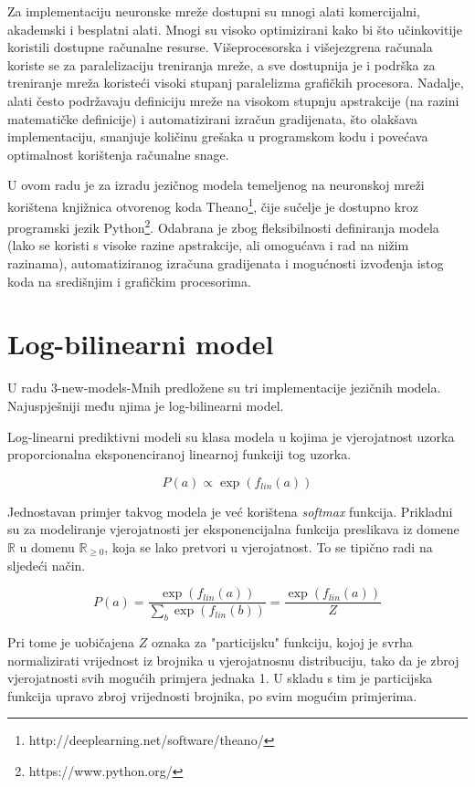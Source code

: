 \documentclass[times, utf8, diplomski, numeric]{fer}
\begin{document}
Za implementaciju neuronske mreže dostupni su mnogi alati komercijalni, akademski i besplatni alati. Mnogi su visoko optimizirani kako bi što učinkovitije koristili dostupne računalne resurse. Višeprocesorska i višejezgrena računala koriste se za paralelizaciju treniranja mreže, a sve dostupnija je i podrška za treniranje mreža koristeći visoki stupanj paralelizma grafičkih procesora. Nadalje, alati često podržavaju definiciju mreže na visokom stupnju apstrakcije (na razini matematičke definicije) i automatizirani izračun gradijenata, što olakšava implementaciju, smanjuje količinu grešaka u programskom kodu i povećava optimalnost korištenja računalne snage.

U ovom radu je za izradu jezičnog modela temeljenog na neuronskoj mreži korištena knjižnica otvorenog koda Theano\footnote{http://deeplearning.net/software/theano/}, čije sučelje je dostupno kroz programski jezik Python\footnote{https://www.python.org/}. Odabrana je zbog fleksibilnosti definiranja modela (lako se koristi s visoke razine apstrakcije, ali omogućava i rad na nižim razinama), automatiziranog izračuna gradijenata i mogućnosti izvođenja istog koda na središnjim i grafičkim procesorima.

\chapter{Log-bilinearni model}
\label{sec:lbl}

U radu \cite{MnihH07} 3-new-models-Mnih predložene su tri implementacije jezičnih modela. Najuspješniji među njima je log-bilinearni model.

Log-linearni prediktivni modeli su klasa modela u kojima je vjerojatnost uzorka proporcionalna eksponenciranoj linearnoj funkciji tog uzorka.

\[
P(a) \propto \exp(f_{lin}(a))
\]

 Jednostavan primjer takvog modela je već korištena \textit{softmax} funkcija. Prikladni su za modeliranje vjerojatnosti jer eksponencijalna funkcija preslikava iz domene $\mathbb{R}$ u domenu $\mathbb{R}_{\geq 0}$, koja se lako pretvori u vjerojatnost. To se tipično radi na sljedeći način.

\[
P(a) = \frac{\exp(f_{lin}(a))}{ \sum_b \exp(f_{lin}(b))} = \frac{\exp(f_{lin}(a))}{Z}
\]

Pri tome je uobičajena $Z$ oznaka za "particijsku" funkciju, kojoj je svrha normalizirati vrijednost iz brojnika u vjerojatnosnu distribuciju, tako da je zbroj vjerojatnosti svih mogućih primjera jednaka 1. U skladu s tim je particijska funkcija upravo zbroj vrijednosti brojnika, po svim mogućim primjerima.
\end{document}
